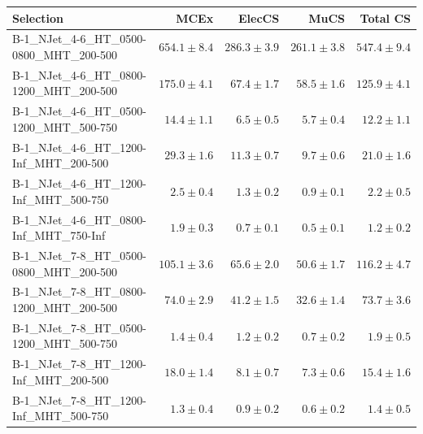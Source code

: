 \documentclass{beamer}
\begin{document}
\begin{frame}
\tiny
\begin{tabular}{lrrrr}
\toprule

                                                Selection  &          MCEx  &         ElecCS  &                     MuCS  &          Total CS  \\
\midrule
      B-1\_NJet\_4-6\_HT\_0500-0800\_MHT\_200-500 &             $654.1\pm8.4$&            $286.3\pm3.9$&            $261.1\pm3.8$&                 $547.4\pm9.4$ \\
      B-1\_NJet\_4-6\_HT\_0800-1200\_MHT\_200-500 &             $175.0\pm4.1$&             $67.4\pm1.7$&             $58.5\pm1.6$&                 $125.9\pm4.1$ \\
      B-1\_NJet\_4-6\_HT\_0500-1200\_MHT\_500-750 &              $14.4\pm1.1$&              $6.5\pm0.5$&              $5.7\pm0.4$&                  $12.2\pm1.1$ \\
       B-1\_NJet\_4-6\_HT\_1200-Inf\_MHT\_200-500 &              $29.3\pm1.6$&             $11.3\pm0.7$&              $9.7\pm0.6$&                  $21.0\pm1.6$ \\
       B-1\_NJet\_4-6\_HT\_1200-Inf\_MHT\_500-750 &               $2.5\pm0.4$&              $1.3\pm0.2$&              $0.9\pm0.1$&                   $2.2\pm0.5$ \\
       B-1\_NJet\_4-6\_HT\_0800-Inf\_MHT\_750-Inf &               $1.9\pm0.3$&              $0.7\pm0.1$&              $0.5\pm0.1$&                   $1.2\pm0.2$ \\
      B-1\_NJet\_7-8\_HT\_0500-0800\_MHT\_200-500 &             $105.1\pm3.6$&             $65.6\pm2.0$&             $50.6\pm1.7$&                 $116.2\pm4.7$ \\
      B-1\_NJet\_7-8\_HT\_0800-1200\_MHT\_200-500 &              $74.0\pm2.9$&             $41.2\pm1.5$&             $32.6\pm1.4$&                  $73.7\pm3.6$ \\
      B-1\_NJet\_7-8\_HT\_0500-1200\_MHT\_500-750 &               $1.4\pm0.4$&              $1.2\pm0.2$&              $0.7\pm0.2$&                   $1.9\pm0.5$ \\
       B-1\_NJet\_7-8\_HT\_1200-Inf\_MHT\_200-500 &              $18.0\pm1.4$&              $8.1\pm0.7$&              $7.3\pm0.6$&                  $15.4\pm1.6$ \\
       B-1\_NJet\_7-8\_HT\_1200-Inf\_MHT\_500-750 &               $1.3\pm0.4$&              $0.9\pm0.2$&              $0.6\pm0.2$&                   $1.4\pm0.5$ \\

\end{tabular}
\end{frame}
\end{document}
